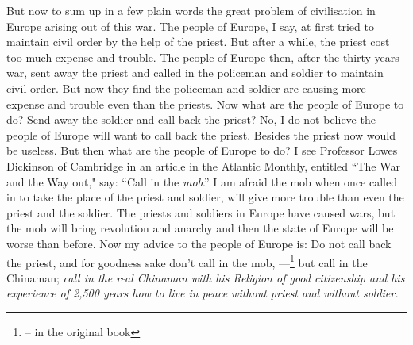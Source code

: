 But now to sum up in a few plain words the great problem of civilisation in Europe arising out of this war.
The people of Europe, I say, at first tried to maintain civil order by the help of the priest.
But after a while, the priest cost too much expense and trouble.
The people of Europe then, after the thirty years war, sent away the priest and called in the policeman and soldier to maintain civil order.
But now they find the policeman and soldier are causing more expense and trouble even than the priests.
Now what are the people of Europe to do?
Send away the soldier and call back the priest?
No, I do not believe the people of Europe will want to call back the priest.
Besides the priest now would be useless.
But then what are the people of Europe to do?
I see Professor Lowes Dickinson  of Cambridge in an article in the Atlantic Monthly, entitled ``The War and the Way out," say: ``Call in the \emph{mob}.''
I am afraid the mob when once called in to take the place of the priest and soldier, will give more trouble than even the priest and the soldier.
The priests and soldiers in Europe have caused wars, but the mob will bring revolution and anarchy and then the state of Europe will be worse than before.
Now my advice to the people of Europe is: Do not call back the priest, and for goodness sake don't call in the mob, ---\footnote{-- in the original book} but call in the Chinaman; \emph{call in the real Chinaman with his Religion of good citizenship and his experience of 2,500 years how to live in peace without priest and without soldier.}

